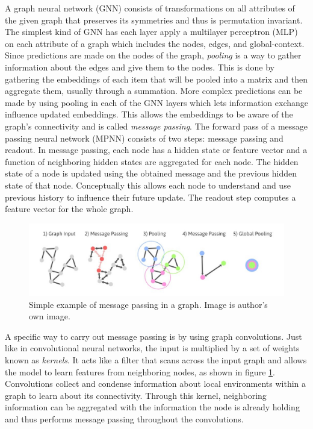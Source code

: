 \documentclass[12pt, abstract = true]{scrartcl}
\begin{document}
A graph neural network (GNN) consists of transformations on all attributes of the given graph 
that preserves its symmetries and thus is permutation invariant. The simplest kind of GNN has 
each layer apply a multilayer perceptron (MLP) on each attribute of a graph which includes the
nodes, edges, and global-context. Since predictions are made on the nodes of the graph, \emph{pooling} 
is a way to gather information about the edges and give them to the nodes. This is done by 
gathering the embeddings of each item that will be pooled into a matrix and then aggregate them, 
usually through a summation. More complex predictions can be made by using pooling 
in each of the GNN layers which lets information exchange influence updated embeddings. This 
allows the embeddings to be aware of the graph's connectivity and is called \emph{message passing}. 
The forward pass of a message passing neural network (MPNN) consists of two steps: message passing 
and readout. In message passing, each node has a hidden state or feature vector and a function of 
neighboring hidden states are aggregated for each node. The hidden state of a node is updated using 
the obtained message and the previous hidden state of that node. Conceptually this allows each node 
to understand and use previous history to influence their future update. The readout step computes 
a feature vector for the whole graph.

\begin{figure}
  \centering
  \includegraphics[scale=1.75]{mpnn.jpeg}
  
  \caption{Simple example of message passing in a graph. Image is author's own image.}\label{fig:mpnn}
\end{figure}

A specific way to carry out message passing is by using graph convolutions. Just like in convolutional 
neural networks, the input is multiplied by a set of weights known as \emph{kernels}. It acts like a 
filter that scans across the input graph and allows the model to learn features from neighboring nodes, as shown in figure \ref{fig:mpnn}.
Convolutions collect and condense information about local environments within a graph to learn about 
its connectivity. Through this kernel, neighboring information can be aggregated with the information 
the node is already holding and thus performs message passing throughout the convolutions.
\end{document}
